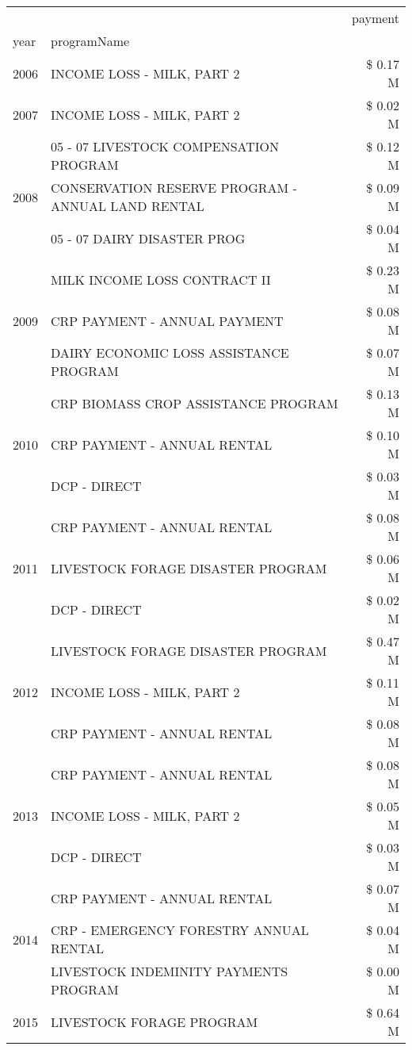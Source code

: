 \begin{tabular}{llr}
\toprule
 &  & payment \\
year & programName &  \\
\midrule
2006 & INCOME LOSS - MILK, PART 2 & \$ 0.17 M \\
\cline{1-3}
2007 & INCOME LOSS - MILK, PART 2 & \$ 0.02 M \\
\cline{1-3}
\multirow[t]{3}{*}{2008} & 05 - 07 LIVESTOCK COMPENSATION PROGRAM & \$ 0.12 M \\
 & CONSERVATION RESERVE PROGRAM - ANNUAL LAND RENTAL & \$ 0.09 M \\
 & 05 - 07 DAIRY DISASTER PROG & \$ 0.04 M \\
\cline{1-3}
\multirow[t]{3}{*}{2009} & MILK INCOME LOSS CONTRACT II & \$ 0.23 M \\
 & CRP PAYMENT - ANNUAL PAYMENT & \$ 0.08 M \\
 & DAIRY ECONOMIC LOSS ASSISTANCE PROGRAM & \$ 0.07 M \\
\cline{1-3}
\multirow[t]{3}{*}{2010} & CRP BIOMASS CROP ASSISTANCE PROGRAM & \$ 0.13 M \\
 & CRP PAYMENT - ANNUAL RENTAL & \$ 0.10 M \\
 & DCP - DIRECT & \$ 0.03 M \\
\cline{1-3}
\multirow[t]{3}{*}{2011} & CRP PAYMENT - ANNUAL RENTAL & \$ 0.08 M \\
 & LIVESTOCK FORAGE DISASTER PROGRAM & \$ 0.06 M \\
 & DCP - DIRECT & \$ 0.02 M \\
\cline{1-3}
\multirow[t]{3}{*}{2012} & LIVESTOCK FORAGE DISASTER PROGRAM & \$ 0.47 M \\
 & INCOME LOSS - MILK, PART 2 & \$ 0.11 M \\
 & CRP PAYMENT - ANNUAL RENTAL & \$ 0.08 M \\
\cline{1-3}
\multirow[t]{3}{*}{2013} & CRP PAYMENT - ANNUAL RENTAL & \$ 0.08 M \\
 & INCOME LOSS - MILK, PART 2 & \$ 0.05 M \\
 & DCP - DIRECT & \$ 0.03 M \\
\cline{1-3}
\multirow[t]{3}{*}{2014} & CRP PAYMENT - ANNUAL RENTAL & \$ 0.07 M \\
 & CRP - EMERGENCY FORESTRY ANNUAL RENTAL & \$ 0.04 M \\
 & LIVESTOCK INDEMINITY PAYMENTS PROGRAM & \$ 0.00 M \\
\cline{1-3}
\multirow[t]{3}{*}{2015} & LIVESTOCK FORAGE PROGRAM & \$ 0.64 M \\

\end{tabular}
